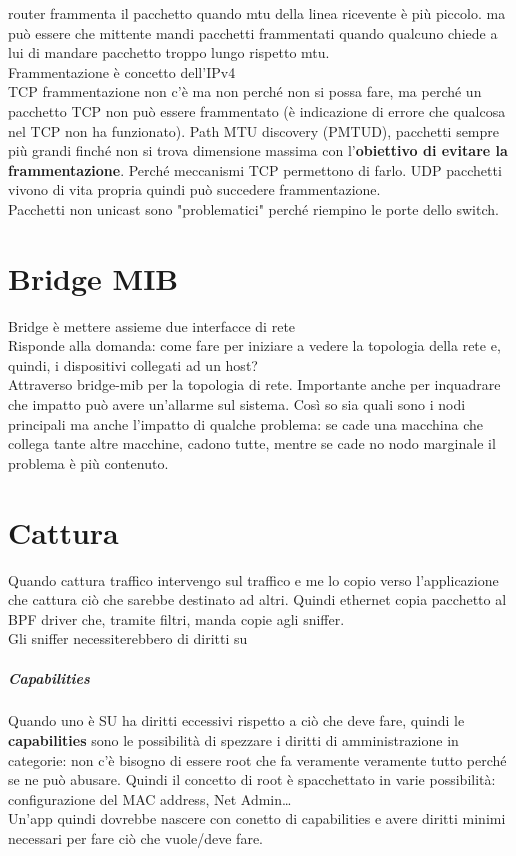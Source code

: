 \documentclass[10pt]{book}
\begin{document}
router frammenta il pacchetto quando mtu della linea ricevente è più piccolo. ma può essere che mittente mandi pacchetti frammentati quando qualcuno chiede a lui di mandare pacchetto troppo lungo rispetto mtu.\\
Frammentazione è concetto dell'IPv4\\
TCP frammentazione non c'è ma non perché non si possa fare, ma perché un pacchetto TCP non può essere frammentato (è indicazione di errore che qualcosa nel TCP non ha funzionato). Path MTU discovery (PMTUD), pacchetti sempre più grandi finché non si trova dimensione massima con l'\textbf{obiettivo di evitare la frammentazione}. Perché meccanismi TCP permettono di farlo. UDP pacchetti vivono di vita propria quindi può succedere frammentazione.\\
Pacchetti non unicast sono "problematici" perché riempino le porte dello switch.
\chapter{Bridge MIB}
Bridge è mettere assieme due interfacce di rete\\
Risponde alla domanda: come fare per iniziare a vedere la topologia della rete e, quindi, i dispositivi collegati ad un host?\\
Attraverso bridge-mib per la topologia di rete. Importante anche per inquadrare che impatto può avere un'allarme sul sistema. Così so sia quali sono i nodi principali ma anche l'impatto di qualche problema: se cade una macchina che collega tante altre macchine, cadono tutte, mentre se cade no nodo marginale il problema è più contenuto.
\chapter{Cattura}
Quando cattura traffico intervengo sul traffico e me lo copio verso l'applicazione che cattura ciò che sarebbe destinato ad altri. Quindi ethernet copia pacchetto al BPF driver che, tramite filtri, manda copie agli sniffer.\\
Gli sniffer necessiterebbero di diritti su
\paragraph{Capabilities} Quando uno è SU ha diritti eccessivi rispetto a ciò che deve fare, quindi le \textbf{capabilities} sono le possibilità di spezzare i diritti di amministrazione in categorie: non c'è bisogno di essere root che fa veramente veramente tutto perché se ne può abusare. Quindi il concetto di root è spacchettato in varie possibilità: configurazione del MAC address, Net Admin\ldots\\
Un'app quindi dovrebbe nascere con conetto di capabilities e avere diritti minimi necessari per fare ciò che vuole/deve fare.
\end{document}
